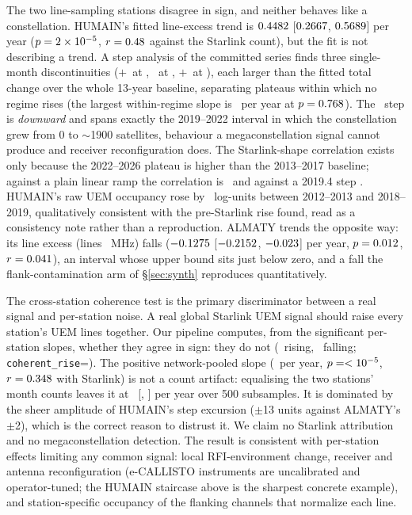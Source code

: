 \documentclass[twocolumn]{aastex631}
\newcommand{\code}[1]{\texttt{#1}}
\begin{document}
The two line-sampling stations disagree in sign, and neither behaves like a constellation.
HUMAIN's fitted line-excess trend is $0.4482$
[$0.2667$, $0.5689$] per year ($p=2\times10^{-5}$,
$r=0.48$ against the Starlink count), but the fit is not describing a trend.
A step analysis of the committed series finds three single-month discontinuities
($+$\rfRealHumStepOneDelta\ at \rfRealHumStepOneYr, \rfRealHumStepTwoDelta\ at
\rfRealHumStepTwoYr, $+$\rfRealHumStepThreeDelta\ at \rfRealHumStepThreeYr), each larger than
the fitted total change over the whole 13-year baseline, separating plateaus within which no
regime rises (the largest within-regime slope is \rfRealHumMaxRegimeSlope\ per year at
$p=0.768$). The \rfRealHumStepTwoDelta\ step is \emph{downward} and spans
exactly the 2019--2022 interval in which the constellation grew from 0 to $\sim$1900 satellites,
behaviour a megaconstellation signal cannot produce and receiver reconfiguration does. The
Starlink-shape correlation exists only because the 2022--2026 plateau is higher than the
2013--2017 baseline; against a plain linear ramp the correlation is \rfRealHumShapeRamp\ and
against a 2019.4 step \rfRealHumShapeStep. HUMAIN's raw UEM occupancy rose by
\rfRealHUMAINPerez\ log-units between 2012--2013 and 2018--2019, qualitatively consistent with
the pre-Starlink rise \citet{prieto2020} found, read as a consistency note rather than a
reproduction. ALMATY trends the opposite way: its line excess (lines \rfRealALMATYLines~MHz)
falls ($-0.1275$ [$-0.2152$, $-0.023$] per year,
$p=0.012$, $r=0.041$), an interval whose upper bound sits just
below zero, and a fall the flank-contamination arm of \S\ref{sec:synth} reproduces
quantitatively.

The cross-station coherence test is the primary discriminator between a real signal and
per-station noise. A real global Starlink UEM signal should raise every station's UEM lines
together. Our pipeline computes, from the significant per-station slopes, whether they agree in
sign: they do not (\rfRealNRising\ rising, \rfRealNFalling\ falling;
\code{coherent\_rise}=\rfRealCoherent). The positive network-pooled slope
(\rfRealLineExcessSlope\ per year, $p=<10^{-5}$, $r=0.348$ with Starlink) is not a
count artifact: equalising the two stations' month counts leaves it at \rfRealEqualNSlope\
[\rfRealEqualNLo, \rfRealEqualNHi] per year over 500 subsamples. It is dominated by the sheer
amplitude of HUMAIN's step excursion ($\pm$13 units against ALMATY's
$\pm$2), which is the correct reason to distrust it. We claim no Starlink attribution and no
megaconstellation detection. The result is consistent with per-station effects limiting any
common signal: local RFI-environment change, receiver and antenna reconfiguration (e-CALLISTO
instruments are uncalibrated and operator-tuned; the HUMAIN staircase above is the sharpest
concrete example), and station-specific occupancy of the flanking channels that normalize each
line.
\end{document}
